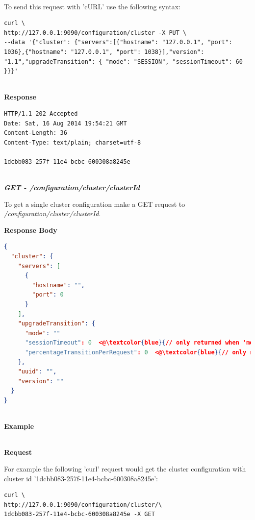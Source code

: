 \documentclass[a4paper,11pt,twoside]{report}
\begin{document}
\noindent \\
To send this request with 'cURL' use the following syntax:\bigskip

\begin{lstlisting}[language=terminal]
curl \
http://127.0.0.1:9090/configuration/cluster -X PUT \
--data '{"cluster": {"servers":[{"hostname": "127.0.0.1", "port": 1036},{"hostname": "127.0.0.1", "port": 1038}],"version": "1.1","upgradeTransition": { "mode": "SESSION", "sessionTimeout": 60 }}}'
\end{lstlisting}

\noindent \\
\textbf{Response}

\begin{lstlisting}[language=terminal]
HTTP/1.1 202 Accepted
Date: Sat, 16 Aug 2014 19:54:21 GMT
Content-Length: 36
Content-Type: text/plain; charset=utf-8
 
1dcbb083-257f-11e4-bcbc-600308a8245e
\end{lstlisting}

\noindent \\
\textit{\textbf{GET - /configuration/cluster/{clusterId}}}\bigskip

\noindent 
To get a single cluster configuration make a GET request to \textit{/configuration/cluster/{clusterId}}.\bigskip 

\noindent 
\textbf{Response Body}

\begin{lstlisting}[language=json]
{
  "cluster": {
    "servers": [
      {
        "hostname": "",
        "port": 0
      }
    ],
    "upgradeTransition": {
      "mode": ""
      "sessionTimeout": 0  <@\textcolor{blue}{// only returned when 'mode' is "SESSION" }@>
      "percentageTransitionPerRequest": 0  <@\textcolor{blue}{// only returned when 'mode' is "GRADUAL"}@>
    },
    "uuid": "",
    "version": ""
  }
} 
\end{lstlisting}

\noindent \\
\textbf{Example}

\noindent \\
\textbf{Request}

\noindent 
For example the following 'curl' request would get the cluster configuration with cluster id '1dcbb083-257f-11e4-bcbc-600308a8245e':\bigskip

\begin{lstlisting}[language=terminal]
curl \
http://127.0.0.1:9090/configuration/cluster/\
1dcbb083-257f-11e4-bcbc-600308a8245e -X GET
\end{lstlisting}
\end{document}
